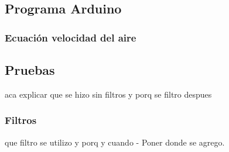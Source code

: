     \subsection{Programa Arduino}
        \subsubsection{Ecuación velocidad del aire}
    \subsection{Pruebas}
    aca explicar que se hizo sin filtros y porq se filtro despues
        \subsubsection{Filtros}
        que filtro se utilizo y porq y cuando
    - Poner donde se agrego.

\newpage